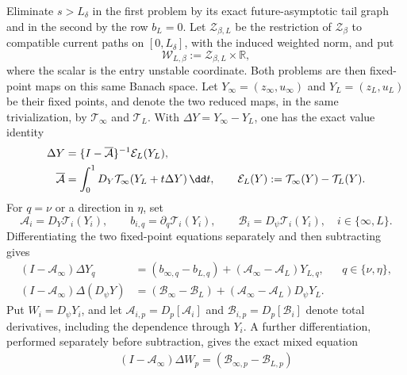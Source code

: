 \begin{lemma}
Eliminate \(s>L_\delta\) in the first problem by its exact
future-asymptotic tail graph and in the second by the row \(b_L=0\).
Let \(\mathscr Z_{\beta,L}\) be the restriction of
\(\mathscr Z_\beta\) to compatible current paths on \([0,L_\delta]\),
with the induced weighted norm, and put
\begin{equation}
 \mathscr W_{L,\beta}:=\mathscr Z_{\beta,L}\times\mathbb R,       \label{eq:anchor-common-core-product-space}
\end{equation}
where the scalar is the entry unstable coordinate.  Both problems are then
fixed-point maps on this same Banach space.  Let
\(Y_\infty=(z_\infty,u_\infty)\) and
\(Y_L=(z_L,u_L)\) be their fixed points, and denote the two reduced maps,
in the same trivialization, by
\(\mathcal T_\infty\) and \(\mathcal T_L\).  With
\(\Delta Y=Y_\infty-Y_L\), one has the exact value identity
\begin{align}
 \Delta Y
 &=\{I-\overline{\mathcal A}\}^{-1}
       \mathcal E_L(Y_L),\notag\\
 \overline{\mathcal A}
 &=\int_0^1D_Y\mathcal T_\infty
       (Y_L+t\Delta Y)\,\dd t,\qquad
 \mathcal E_L(Y)
 :=\mathcal T_\infty(Y)-\mathcal T_L(Y).
                                                        \label{eq:anchor-tail-value-difference}
\end{align}
For \(q=\nu\) or a direction in \(\eta\), set
\[
 \mathcal A_i=D_Y\mathcal T_i(Y_i),\qquad
 b_{i,q}=\partial_q\mathcal T_i(Y_i),\qquad
 \mathcal B_i=D_\psi\mathcal T_i(Y_i),
 \quad i\in\{\infty,L\}.
\]
Differentiating the two fixed-point equations separately and then
subtracting gives
\begin{align}
 (I-\mathcal A_\infty)\Delta Y_q
  &=(b_{\infty,q}-b_{L,q})
       +(\mathcal A_\infty-\mathcal A_L)Y_{L,q},
       &&q\in\{\nu,\eta\},                          \label{eq:anchor-tail-parameter-difference}\\
 (I-\mathcal A_\infty)\Delta(D_\psi Y)
  &=(\mathcal B_\infty-\mathcal B_L)
       +(\mathcal A_\infty-\mathcal A_L)D_\psi Y_L .
                                                        \label{eq:anchor-tail-state-difference}
\end{align}
Put \(W_i=D_\psi Y_i\), and let
\(\mathcal A_{i,p}=D_p[\mathcal A_i]\) and
\(\mathcal B_{i,p}=D_p[\mathcal B_i]\) denote total derivatives, including
the dependence through \(Y_i\).  A further differentiation, performed
separately before subtraction, gives the exact mixed equation
\begin{multline}
 (I-\mathcal A_\infty)\Delta W_p
 =(\mathcal B_{\infty,p}-\mathcal B_{L,p})

\end{multline}
\end{lemma}
